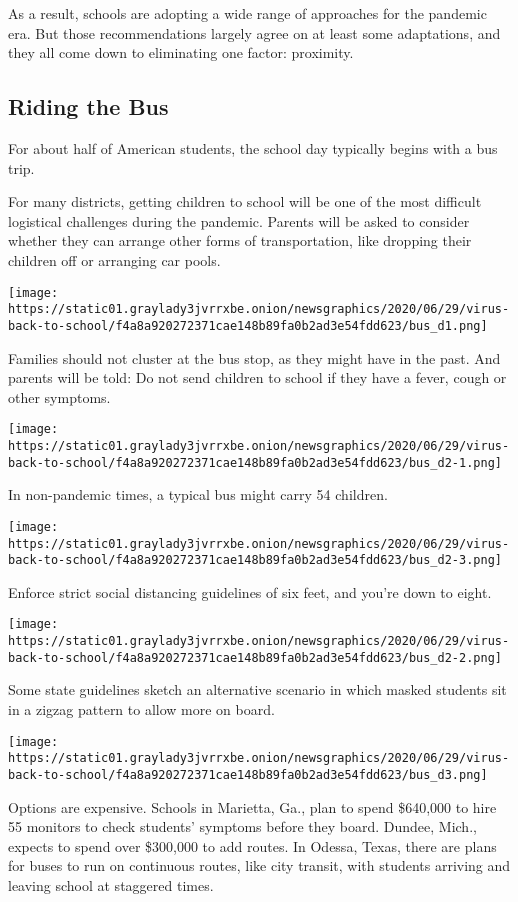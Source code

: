 As a result, schools are adopting a wide range of approaches for the
pandemic era. But those recommendations largely agree on at least some
adaptations, and they all come down to eliminating one factor:
proximity.

\hypertarget{riding-the-bus}{%
\subsection{Riding the Bus}\label{riding-the-bus}}

For about half of American students, the school day typically begins
with a bus trip.

For many districts, getting children to school will be one of the most
difficult logistical challenges during the pandemic. Parents will be
asked to consider whether they can arrange other forms of
transportation, like dropping their children off or arranging car pools.

\texttt{[image: https://static01.graylady3jvrrxbe.onion/newsgraphics/2020/06/29/virus-back-to-school/f4a8a920272371cae148b89fa0b2ad3e54fdd623/bus\_d1.png]}

Families should not cluster at the bus stop, as they might have in the
past. And parents will be told: Do not send children to school if they
have a fever, cough or other symptoms.

\texttt{[image: https://static01.graylady3jvrrxbe.onion/newsgraphics/2020/06/29/virus-back-to-school/f4a8a920272371cae148b89fa0b2ad3e54fdd623/bus\_d2-1.png]}

In non-pandemic times, a typical bus might carry 54 children.

\texttt{[image: https://static01.graylady3jvrrxbe.onion/newsgraphics/2020/06/29/virus-back-to-school/f4a8a920272371cae148b89fa0b2ad3e54fdd623/bus\_d2-3.png]}

Enforce strict social distancing guidelines of six feet, and you're down
to eight.

\texttt{[image: https://static01.graylady3jvrrxbe.onion/newsgraphics/2020/06/29/virus-back-to-school/f4a8a920272371cae148b89fa0b2ad3e54fdd623/bus\_d2-2.png]}

Some state guidelines sketch an alternative scenario in which masked
students sit in a zigzag pattern to allow more on board.

\texttt{[image: https://static01.graylady3jvrrxbe.onion/newsgraphics/2020/06/29/virus-back-to-school/f4a8a920272371cae148b89fa0b2ad3e54fdd623/bus\_d3.png]}

Options are expensive. Schools in Marietta, Ga., plan to spend \$640,000
to hire 55 monitors to check students' symptoms before they board.
Dundee, Mich., expects to spend over \$300,000 to add routes. In Odessa,
Texas, there are plans for buses to run on continuous routes, like city
transit, with students arriving and leaving school at staggered times.

